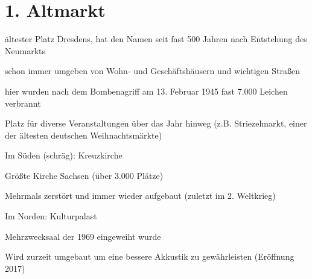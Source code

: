 \documentclass[a4paper,12pt]{report}
\begin{document}
\section{1. Altmarkt}
\begin{itemize*}
\item ältester Platz Dresdens, hat den Namen seit fast 500 Jahren nach Entstehung des Neumarkts
\item schon immer umgeben von Wohn- und Geschäftshäusern und wichtigen Straßen
\item hier wurden nach dem Bombenagriff am 13. Februar 1945 fast 7.000 Leichen verbrannt
\item Platz für diverse Veranstaltungen über das Jahr hinweg (z.B. Striezelmarkt, einer der ältesten deutschen Weihnachtsmärkte)
\item Im Süden (schräg): Kreuzkirche
    \begin{itemize*}
    \item Größte Kirche Sachsen (über 3.000 Plätze)
    \item Mehrmals zerstört und immer wieder aufgebaut (zuletzt im 2. Weltkrieg)
    \end{itemize*}
\item Im Norden: Kulturpalast
    \begin{itemize*}
    \item Mehrzwecksaal der 1969 eingeweiht wurde
    \item Wird zurzeit umgebaut um eine bessere Akkustik zu gewährleisten (Eröffnung 2017)
    \end{itemize*}
\end{itemize*}
\end{document}
